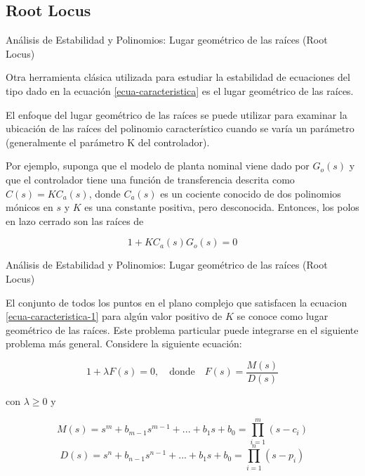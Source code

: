 \documentclass{beamer}
\begin{document}
\subsection{Root Locus}
\begin{frame}{Análisis de Estabilidad y Polinomios: Lugar geométrico de las raíces (Root Locus)}
\begin{justify}

Otra herramienta clásica utilizada para estudiar la estabilidad de ecuaciones del tipo dado en la ecuación \ref{ecua-caracteristica} es el lugar geométrico de las raíces. 

\vspace{0.3 cm}
El enfoque del lugar geométrico de las raíces se puede utilizar para examinar la ubicación de las raíces del polinomio característico cuando se varía un parámetro (generalmente el parámetro K del controlador). 

\vspace{0.3 cm}
Por ejemplo, suponga que el modelo de planta nominal viene dado por $G_o(s)$ y que el controlador tiene una función de transferencia descrita como $C(s) = KC_a(s)$, donde $C_a(s)$ es un cociente conocido de dos polinomios mónicos en $s$ y $K$ es una constante positiva, pero desconocida. Entonces, los polos en lazo cerrado son las raíces de

\begin{equation}\label{ecua-caracteristica-1}
    1 + KC_a(s)G_o(s) = 0
\end{equation}

\end{justify}
\end{frame}

\begin{frame}{Análisis de Estabilidad y Polinomios: Lugar geométrico de las raíces (Root Locus)}
\begin{justify}

El conjunto de todos los puntos en el plano complejo que satisfacen la ecuacion \ref{ecua-caracteristica-1} para algún valor positivo de $K$ se conoce como lugar geométrico de las raíces. Este problema particular puede integrarse en el siguiente problema más general. Considere la siguiente ecuación:

\begin{equation}\label{ecua-caracteristica-p1}
    1 + \lambda F(s) = 0, \ \ \ \text{ donde } \ \ \ F(s)= \frac{M(s)}{D(s)}
\end{equation}

con $\lambda \geq 0$ y

{\footnotesize
\begin{equation*}\label{polinomio-m}
    M(s) = s^{m} + b_{m-1}s^{m-1}+ ... + b_1s + b_0 = \prod_{i=1}^{m} (s-c_i)
\end{equation*}
}
{\footnotesize
\begin{equation*}\label{polinomio-m}
    D(s) = s^{n} + b_{n-1}s^{n-1}+ ... + b_1s + b_0 = \prod_{i=1}^{n} (s-p_i)
\end{equation*}
}

\end{justify}
\end{frame}
\end{document}

